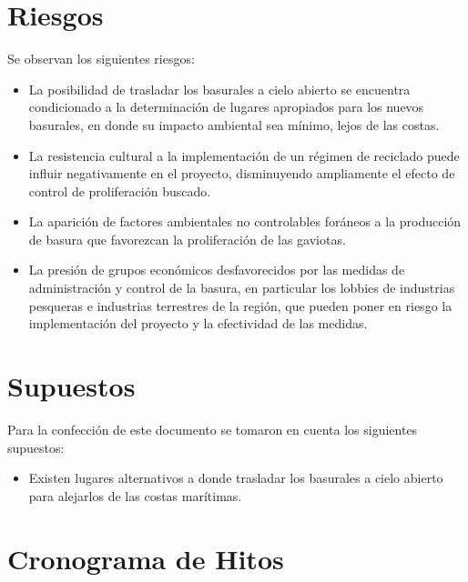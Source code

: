 \documentclass[a4paper,11pt]{article}
\begin{document}
\section{Riesgos}

Se observan los siguientes riesgos:

\begin{itemize}

  \item La posibilidad de trasladar los basurales a cielo abierto se encuentra
    condicionado a la determinación de lugares apropiados para los nuevos
    basurales, en donde su impacto ambiental sea mínimo, lejos de las costas.

  \item La resistencia cultural a la implementación de un régimen de reciclado
    puede influir negativamente en el proyecto, disminuyendo ampliamente el
    efecto de control de proliferación buscado.

  \item La aparición de factores ambientales no controlables foráneos a la
    producción de basura que favorezcan la proliferación de las gaviotas.

  \item La presión de grupos económicos desfavorecidos por las medidas de
    administración y control de la basura, en particular los lobbies de
    industrias pesqueras e industrias terrestres de la región, que pueden poner
    en riesgo la implementación del proyecto y la efectividad de las medidas.

\end{itemize}

\section{Supuestos}

Para la confección de este documento se tomaron en cuenta los siguientes
supuestos:

\begin{itemize}

  \item Existen lugares alternativos a donde trasladar los basurales a cielo
    abierto para alejarlos de las costas marítimas.

\end{itemize}

\section{Cronograma de Hitos}
\end{document}

